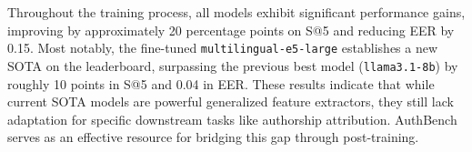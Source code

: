 \documentclass{article}
\begin{document}
Throughout the training process, all models exhibit significant performance gains, improving by approximately 20 percentage points on S@5 and reducing EER by 0.15. Most notably, the fine-tuned \texttt{multilingual-e5-large} establishes a new SOTA on the leaderboard, surpassing the previous best model (\texttt{llama3.1-8b}) by roughly 10 points in S@5 and 0.04 in EER. These results indicate that while current SOTA models are powerful generalized feature extractors, they still lack adaptation for specific downstream tasks like authorship attribution. AuthBench serves as an effective resource for bridging this gap through post-training.



\end{document}
